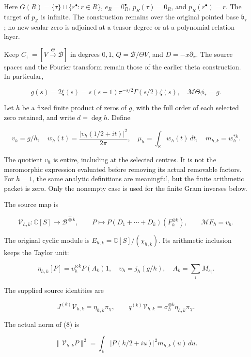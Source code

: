 Here \(G(R)=\{\tau\}\sqcup\{r^\bullet:r\in R\}\), \(e_R=0_R^\bullet\), \(p_R(\tau)=0_R\), and \(p_R(r^\bullet)=r\). The target of \(p_{\mathbb Z}\) is infinite. The construction remains over the original pointed base \(\mathfrak b_\tau\); no new scalar zero is adjoined at a tensor degree or at a polynomial relation layer.

Keep \(C_+=[V\xrightarrow{\Theta}\mathscr B]\) in degrees \(0,1\), \(Q=\mathscr B/\Theta V\), and \(D=-x\partial_x\). The source spaces and the Fourier transform remain those of the earlier theta construction. In particular,

\[
 g(s)=2\xi(s)=s(s-1)\pi^{-s/2}\Gamma(s/2)\zeta(s),\quad
 \mathcal M\Theta\phi_*=g.                                            \tag{6}
\]

Let \(h\) be a fixed finite product of zeros of \(g\), with the full order of each selected zero retained, and write \(d=\deg h\). Define

\[
 v_h=g/h,\quad
 w_h(t)=\frac{|v_h(1/2+it)|^2}{2\pi},\quad
 \mu_h=\int_{\mathbb R}w_h(t)\,dt,\quad m_{h,k}=w_h^{*k}.               \tag{7}
\]

The quotient \(v_h\) is entire, including at the selected centres. It is not the meromorphic expression evaluated before removing its actual removable factors. For \(h=1\), the same analytic definitions are meaningful, but the finite arithmetic packet is zero. Only the nonempty case is used for the finite Gram inverses below.

The source map is

\[
 \mathcal V_{h,k}:\mathbb C[S]\longrightarrow\mathscr B^{\widehat\otimes k},
 \qquad P\longmapsto P(D_1+\cdots+D_k)(F_h^{\otimes k}),\qquad
 \mathcal MF_h=v_h.                                                    \tag{8}
\]

The original cyclic module is \(E_{h,k}=\mathbb C[S]/(\chi_{h,k})\). Its arithmetic inclusion keeps the Taylor unit:

\[
 \eta_{h,k}[P]=\upsilon_h^{\otimes k}P(A_k)1,\quad
 \upsilon_h=j_h(g/h),\quad A_k=\sum_iM_{s_i}.                           \tag{9}
\]

The supplied source identities are

\[
 J^{(k)}\mathcal V_{h,k}=\eta_{h,k}\pi_\chi,\qquad
 q^{(k)}\mathcal V_{h,k}=\sigma_h^{\otimes k}\eta_{h,k}\pi_\chi.          \tag{10}
\]

The actual norm of (8) is

\[
 \|\mathcal V_{h,k}P\|^2
 =\int_{\mathbb R}|P(k/2+iu)|^2m_{h,k}(u)\,du.                          \tag{11}
\]


